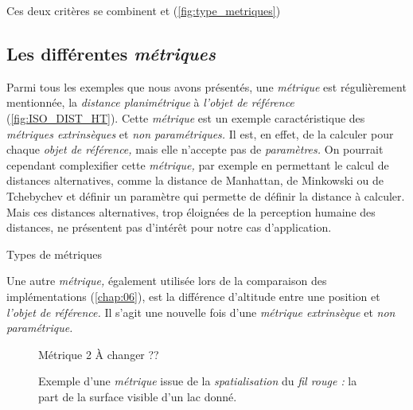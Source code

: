 Ces deux critères se combinent et (\autoref{fig:type_metriques})

\subsection{Les différentes \emph{métriques}}

Parmi tous les exemples que nous avons présentés, une \emph{métrique}
est régulièrement mentionnée, la \emph{distance planimétrique} à
\emph{l'objet de référence} (\autoref{fig:ISO_DIST_HT}). Cette
\emph{métrique} est un exemple caractéristique des \emph{métriques
  extrinsèques} et \emph{non paramétriques.} Il est, en effet, de la
calculer pour chaque \emph{objet de référence,} mais elle n'accepte
pas de \emph{paramètres.} On pourrait cependant complexifier cette
\emph{métrique,} par exemple en permettant le calcul de distances
alternatives, comme la distance de Manhattan, de Minkowski ou de
Tchebychev et définir un paramètre qui permette de définir la distance
à calculer. Mais ces distances alternatives, trop éloignées de la
perception humaine des distances, ne présentent pas d’intérêt pour
notre cas d'application.

\begin{table}
  \centering
  
  \caption{Types de métriques}
  \label{fig:type_metriques}
\end{table}

Une autre \emph{métrique,} également utilisée lors de la comparaison
des implémentations (\autoref{chap:06}), est la différence d'altitude
entre une position et \emph{l'objet de référence.} Il s'agit une
nouvelle fois d'une \emph{métrique extrinsèque} et \emph{non
  paramétrique.} 

\begin{figure}
  \centering
  
  \caption{Métrique 2 À  changer ??}
\end{figure}



\begin{figure}
  \centering
  
  \caption{Exemple d'une \emph{métrique} issue de la
    \emph{spatialisation} du \emph{fil rouge :} la part de la surface
    visible d'un lac donné.}
  \label{fig:metrique_part_lac}
\end{figure}



